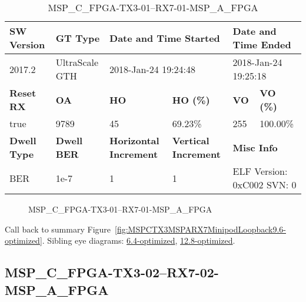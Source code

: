 \begin{table}[h]
\centering
\caption{MSP\_C\_FPGA-TX3-01--RX7-01-MSP\_A\_FPGA}
\label{tab:MSPCFPGATX301RX701MSPAFPGA9.6-optimized}
\begin{tabular}{@{}|l|l|l|l|l|l|@{}}
\toprule
\textbf{SW Version}                & \textbf{GT Type}   & \multicolumn{2}{l|}{\textbf{Date and Time Started}}            & \multicolumn{2}{l|}{\textbf{Date and Time Ended}}        \\ \midrule
2017.2                       & UltraScale GTH          & \multicolumn{2}{l|}{2018-Jan-24 19:24:48}                   & \multicolumn{2}{l|}{2018-Jan-24 19:25:18}               \\ \midrule
\textbf{Reset RX}                  & \textbf{OA} & \textbf{HO}   & \textbf{HO (\%)} & \textbf{VO} & \textbf{VO (\%)} \\ \midrule
true & 9789        & 45          & 69.23\%        & 255        & 100.00\%       \\ \midrule
\textbf{Dwell Type}                & \textbf{Dwell BER} & \textbf{Horizontal Increment} & \textbf{Vertical Increment}    & \multicolumn{2}{l|}{\textbf{Misc Info}}                  \\ \midrule
BER                            & 1e-7        & 1        & 1           & \multicolumn{2}{l|}{ELF Version: 0xC002 SVN: 0}                         \\ \bottomrule
\end{tabular}
\end{table}

\begin{figure}[h]
\caption{MSP\_C\_FPGA-TX3-01--RX7-01-MSP\_A\_FPGA} \label{fig:MSPCFPGATX301RX701MSPAFPGA9.6-optimized}
\end{figure}

Call back to summary Figure~\ref{fig:MSPCTX3MSPARX7MinipodLoopback9.6-optimized}.
Sibling eye diagrams: \hyperref[sec:MSPCFPGATX301RX701MSPAFPGA6.4-optimized]{6.4-optimized}, \hyperref[sec:MSPCFPGATX301RX701MSPAFPGA12.8-optimized]{12.8-optimized}.

\clearpage
\newpage


\subsection{MSP\_C\_FPGA-TX3-02--RX7-02-MSP\_A\_FPGA}\label{sec:MSPCFPGATX302RX702MSPAFPGA9.6-optimized}

